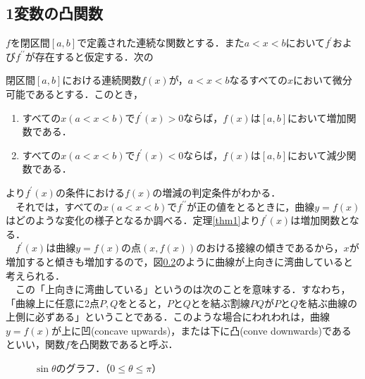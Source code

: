 \subsection{1変数の凸関数}
$f$を閉区間$[a,b]$で定義された連続な関数とする．また$a<x<b$において$f^\prime$および$f^{\prime\prime}$が存在すると仮定する．次の
\begin{kotak}
	\begin{theorem}[増減の判定条件]\label{thm1}
	閉区間$[a,b]$における連続関数$f(x)$が，$a<x<b$なるすべての$x$において微分可能であるとする．このとき，
	\begin{enumerate}
	\item すべての$x$$(a<x<b)$で$f^\prime(x)>0$ならば，$f(x)$は$[a,b]$において増加関数である．
	\item すべての$x$$(a<x<b)$で$f^\prime(x)<0$ならば，$f(x)$は$[a,b]$において減少関数である．
　\end{enumerate}
\end{theorem}
\end{kotak}
より$f^\prime(x)$の条件における$f(x)$の増減の判定条件がわかる．\\
　それでは，すべての$x(a<x<b)$で$f^{\prime\prime}$が正の値をとるときに，曲線$y=f(x)$はどのような変化の様子となるか調べる．定理\ref{thm1}より$f^\prime(x)$は増加関数となる．\\
　$f^\prime(x)$は曲線$y=f(x)$の点$(x,f(x))$のおける接線の傾きであるから，$x$が増加すると傾きも増加するので，図\ref{}のように曲線が上向きに湾曲していると考えられる．\\
　この「上向きに湾曲している」というのは次のことを意味する．すなわち，「曲線上に任意に2点$P,Q$をとると，$P$と$Q$とを結ぶ割線$PQ$が$P$と$Q$を結ぶ曲線の上側に必ずある」ということである．このような場合にわれわれは，曲線$y=f(x)$が上に凹(concave upwards)，または下に凸(conve downwards)であるといい，関数$f$を凸関数であると呼ぶ．
%
　\begin{figure}[H]
 \centering
{}
  \label{sin}
  \caption{$\sin\theta$のグラフ．（$0\leq\theta\leq\pi$）}
\end{figure}











\subsection{}






